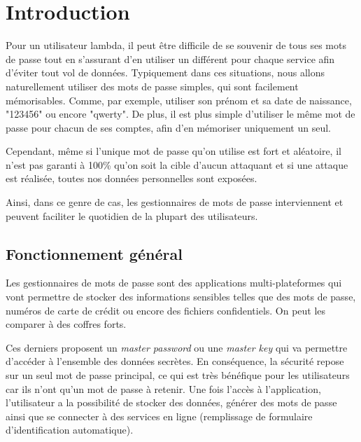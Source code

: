 

\chapter{Introduction}
\label{ch:intro}

Pour un utilisateur lambda, il peut être difficile de se souvenir de tous ses mots de passe tout en s'assurant d'en utiliser un différent pour chaque service afin d'éviter tout vol de données. Typiquement dans ces situations, nous allons naturellement utiliser des mots de passe simples, qui sont facilement mémorisables. Comme, par exemple, utiliser son prénom et sa date de naissance, "123456" ou encore "qwerty". De plus, il est plus simple d'utiliser le même mot de passe pour chacun de ses comptes, afin d'en mémoriser uniquement un seul. 

Cependant, même si l'unique mot de passe qu'on utilise est fort et aléatoire, il n'est pas garanti à 100\% qu'on soit la cible d'aucun attaquant et si une attaque est réalisée, toutes nos données personnelles sont exposées.

Ainsi, dans ce genre de cas, les gestionnaires de mots de passe interviennent et peuvent faciliter le quotidien de la plupart des utilisateurs. 

\section{Fonctionnement général}

Les gestionnaires de mots de passe sont des applications multi-plateformes qui vont permettre de stocker des informations sensibles telles que des mots de passe, numéros de carte de crédit ou encore des fichiers confidentiels. On peut les comparer à des coffres forts.  

Ces derniers proposent un \textit{master password} ou une \textit{master key} qui va permettre d'accéder à l'ensemble des données secrètes. En conséquence, la sécurité repose sur un seul mot de passe principal, ce qui est très bénéfique pour les utilisateurs car ils n'ont qu'un mot de passe à retenir. Une fois l'accès à l'application, l'utilisateur a la possibilité de stocker des données, générer des mots de passe ainsi que se connecter à des services en ligne (remplissage de formulaire d'identification automatique).


